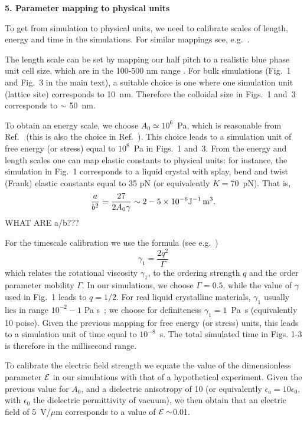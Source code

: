 \documentclass[12pt,twoside]{article}
\begin{document}
{\bf 5. Parameter mapping to physical units}

To get from simulation to physical units, we need to calibrate scales of
length, energy and time in the simulations. For similar mappings see,
e.g.~\cite{denniston2}.

The length scale can be set by mapping our half pitch to a realistic blue
phase unit cell size, which are in the 100-500 nm range \cite{blue1}. 
For bulk simulations (Fig.~1 and Fig.~3 in the main text), a suitable choice
is one where one simulation unit (lattice site) corresponds to 10~nm. Therefore
the colloidal size in Figs.~1 and~3 corresponds to $\sim$ 50~nm. 

To obtain an energy scale, we choose $A_0 \simeq 10^6$~Pa, which is 
reasonable from Ref.~\cite{blue1} (this is also the choice in
Ref.~\cite{oliver2}). This choice leads to a simulation unit of
free energy (or stress) equal to $10^{8}$~Pa in Figs.~1 and~3.
From the energy and length scales one can map elastic constants to
physical units: for instance, the simulation in Fig.~1 corresponds to
a liquid crystal with splay, bend and twist (Frank) elastic constants
equal to 35 pN (or equivalently $K=$70~pN). That is,
\begin{equation}
\frac{a}{b^2} = \frac{27}{2 A_0\gamma} \sim 2-5 \times 10^{-6}
{\rm J}^{-1}\, {\rm m}^{3}.
\end{equation}
WHAT ARE a/b???

For the timescale calibration we use the formula (see e.g.~\cite{denniston})
\begin{equation}
\gamma_1=\frac{2q^2}{\Gamma}
\end{equation}
which relates the rotational viscosity $\gamma_1$, to the ordering strength
$q$ and the order parameter mobility $\Gamma$.
In our simulations, we choose $\Gamma = 0.5$, while the value of $\gamma$
used in Fig.~1 leads to $q=1/2$.   
For real liquid crystalline materials, $\gamma_1$ usually lies in range
$10^{-2}-1$ Pa s~\cite{deGennes}; we choose for definiteness
$\gamma_1 = 1$~Pa~s (equivalently 10 poise). Given the previous mapping for
free energy (or stress) units, this leads to a simulation unit of time equal
to $10^{-8}$~s. The total simulated time in Figs. 1-3 is therefore in the
millisecond range. 

To calibrate the electric field strength 
we equate the value of the dimensionless parameter ${\cal E}$ in our 
simulations with that of a hypothetical experiment.
Given the previous value for $A_0$, and a dielectric anisotropy of 10
(or equivalently $\epsilon_a=10\epsilon_0$, with $\epsilon_0$ the
dielectric permittivity of vacuum), we then obtain that an electric field
of 5~V/$\mu$m corresponds to a value of ${\cal E}\sim$0.01. 
\end{document}
